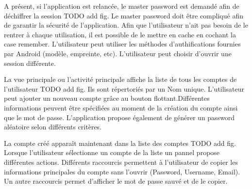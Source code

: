 A présent, si l'application est relancée, le master password est demandé afin de déchiffrer la session TODO add fig. Le master password doit être compliqué afin de garantir la sécurité de l'application. Afin que l'utilisateur n'ait pas besoin de le rentrer à chaque utilisation, il est possible de le mettre en cache en cochant la case remember. L'utilisateur peut utiliser les méthodes d'authifications fournies par Android (modèle, empreinte, etc). L'utilisateur peut choisir d'ouvrir une session différente. 


La vue principale ou l'activité principale affiche la liste de tous les comptes de l'utilisateur TODO add fig. Ils sont répertoriés par un Nom unique. L'utilisateur peut ajouter un nouveau compte grâce au bouton flottant.Différentes informations peuvent être spécifiées au moment de la création du compte ainsi que le mot de passe. L'application \easypass{} propose également de générer un password aléatoire selon différents critères. 


La compte créé apparaît maintenant dans la liste des comptes TODO add fig. Lorsque l'utilisateur sélectionne un compte de la liste un pannel propose différentes actions.
Différents raccourcis permettent à l'utilisateur de copier les informations principales du compte sans l'ouvrir (Password, Username, Email). Un autre raccourcis permet d'afficher le mot de passe sauvé et de le copier. 

